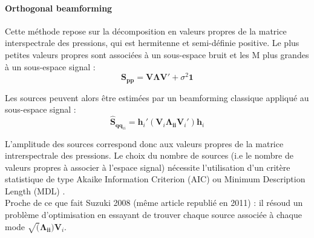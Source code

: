 \paragraph{Orthogonal beamforming}
Cette méthode repose sur la décomposition en valeurs propres de la matrice interspectrale des pressions, qui est hermitenne et semi-définie positive. Le plus petites valeurs propres sont associées à un sous-espace bruit et les M plus grandes à un sous-espace signal : 
\begin{equation}
	\bm{S_{pp}} = \bm{V}\bm{\Lambda}\bm{V}' + \sigma^2\bm{1}
\end{equation}

Les sources peuvent alors être estimées par un beamforming classique appliqué au sous-espace signal : 
\begin{equation}
	\hat{\bm{S}}_{\bm{qq}_{ii}} = \bm{h}_i' (\bm{V}_i \bm{\Lambda_{ii}}\bm{V}_i') \bm{h}_i
\end{equation}

L'amplitude des sources correspond donc aux valeurs propres de la matrice intrerspectrale des pressions.
Le choix du nombre de sources (i.e le nombre de valeurs propres à associer à l'espace signal) nécessite l'utilisation d'un critère statistique de type Akaike Information Criterion (AIC) ou Minimum Description Length (MDL) \citep{Wax1985}.\\

Proche de ce que fait Suzuki 2008 (même article republié en 2011) : il résoud un problème d'optimisation en essayant de trouver chaque source associée à chaque mode $\sqrt(\bm{\Lambda_{ii}})\bm{V}_i$.


